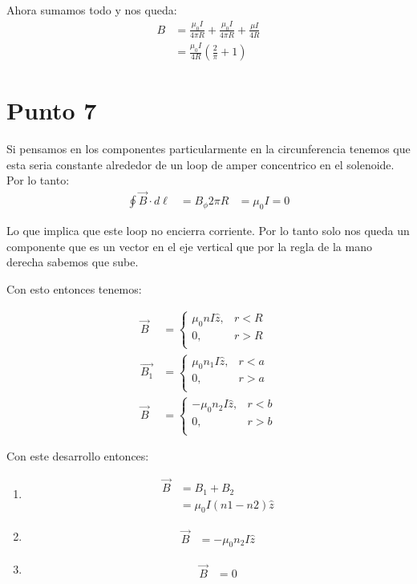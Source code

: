 \documentclass{report}
\begin{document}
Ahora sumamos todo y nos queda:
\begin{align*}
	B &= \frac{\mu_0 I}{4\pi R} + \frac{\mu_0 I}{4\pi R} + \frac{\mu I}{4 R}\\
	&= \frac{\mu_0 I}{4R} \left(\frac{2}{\pi} + 1 \right)
\end{align*}



\chapter{Punto 7}

Si pensamos en los componentes particularmente en la circunferencia tenemos que esta seria constante alrededor de un loop de amper concentrico en el solenoide. Por lo tanto:
\begin{align*}
	\oint \vec{B} \cdot d\ell &= B_\phi 2 \pi R &= \mu_0 I = 0
\end{align*}

Lo que implica que este loop no encierra corriente. Por lo tanto solo nos queda un componente que es un vector en el eje vertical que por la regla de la mano derecha sabemos que sube.

Con esto entonces tenemos:

\begin{align*}
	\vec{B} &= \begin{cases}
		\mu_0 n I \hat{z}, & r < R\\
		0, & r > R\\
	\end{cases}\\
	\vec{B_1} &= \begin{cases}
		\mu_0 n_1 I \hat{z}, & r < a\\
		0, & r > a\\
	\end{cases}\\
	\vec{B} &= \begin{cases}
		-\mu_0 n_2 I \hat{z}, & r < b\\
		0, & r > b\\
	\end{cases}
\end{align*}

Con este desarrollo entonces:

\begin{enumerate}
	\item 
		\begin{align*}
			\vec{B} &= B_1 + B_2\\
			&= \mu_0 I \left(n1 - n2\right) \hat{z}
		\end{align*}

	\item
		\begin{align*}
			\vec{B} &= - \mu_0 n_2 I \hat{z}
		\end{align*}
	
	\item
		\begin{align*}
			\vec{B} &= 0
		\end{align*}
\end{enumerate}
\end{document}
